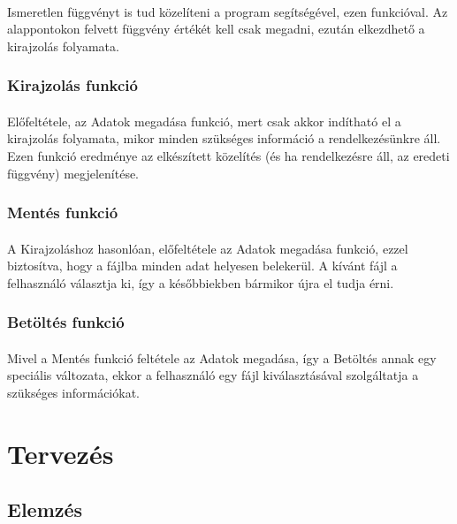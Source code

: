 \documentclass[12pt]{report}
\begin{document}
\paragraph{}
Ismeretlen függvényt is tud közelíteni a program segítségével, ezen funkcióval. Az alappontokon felvett függvény értékét kell csak megadni, ezután elkezdhető a kirajzolás folyamata.

\subsubsection{Kirajzolás funkció}
\paragraph{}
Előfeltétele, az Adatok megadása funkció, mert csak akkor indítható el a kirajzolás folyamata, mikor minden szükséges információ a rendelkezésünkre áll. Ezen funkció eredménye az elkészített közelítés (és ha rendelkezésre áll, az eredeti függvény) megjelenítése.

\subsubsection{Mentés funkció}
\paragraph{}
A Kirajzoláshoz hasonlóan, előfeltétele az Adatok megadása funkció, ezzel biztosítva, hogy a fájlba minden adat helyesen belekerül. A kívánt fájl a felhasználó választja ki, így a későbbiekben bármikor újra el tudja érni.

\subsubsection{Betöltés funkció}
\paragraph{}
Mivel a Mentés funkció feltétele az Adatok megadása, így a Betöltés annak egy speciális változata, ekkor a felhasználó egy fájl kiválasztásával szolgáltatja a szükséges információkat.

\section{Tervezés}

\subsection{Elemzés}
\end{document}
